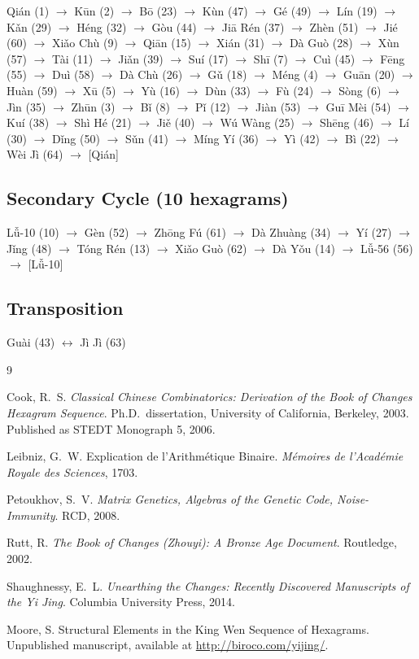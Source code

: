 \documentclass[11pt,a4paper]{article}
\begin{document}
{\small
\noindent
Qián (1) $\to$ Kūn (2) $\to$ Bō (23) $\to$ Kùn (47) $\to$ Gé (49) $\to$ Lín (19) $\to$ Kǎn (29) $\to$ Héng (32) $\to$ Gòu (44) $\to$ Jiā Rén (37) $\to$ Zhèn (51) $\to$ Jié (60) $\to$ Xiǎo Chù (9) $\to$ Qiān (15) $\to$ Xián (31) $\to$ Dà Guò (28) $\to$ Xùn (57) $\to$ Tài (11) $\to$ Jiǎn (39) $\to$ Suí (17) $\to$ Shī (7) $\to$ Cuì (45) $\to$ Fēng (55) $\to$ Duì (58) $\to$ Dà Chù (26) $\to$ Gǔ (18) $\to$ Méng (4) $\to$ Guān (20) $\to$ Huàn (59) $\to$ Xū (5) $\to$ Yù (16) $\to$ Dùn (33) $\to$ Fù (24) $\to$ Sòng (6) $\to$ Jìn (35) $\to$ Zhūn (3) $\to$ Bǐ (8) $\to$ Pǐ (12) $\to$ Jiàn (53) $\to$ Guī Mèi (54) $\to$ Kuí (38) $\to$ Shì Hé (21) $\to$ Jiě (40) $\to$ Wú Wàng (25) $\to$ Shēng (46) $\to$ Lí (30) $\to$ Dǐng (50) $\to$ Sǔn (41) $\to$ Míng Yí (36) $\to$ Yì (42) $\to$ Bì (22) $\to$ Wèi Jì (64) $\to$ [Qián]
}

\subsection*{Secondary Cycle (10 hexagrams)}

{\small
\noindent
Lǚ-10 (10) $\to$ Gèn (52) $\to$ Zhōng Fú (61) $\to$ Dà Zhuàng (34) $\to$ Yí (27) $\to$ Jǐng (48) $\to$ Tóng Rén (13) $\to$ Xiǎo Guò (62) $\to$ Dà Yǒu (14) $\to$ Lǚ-56 (56) $\to$ [Lǚ-10]
}

\subsection*{Transposition}

{\small
\noindent
Guài (43) $\leftrightarrow$ Jì Jì (63)
}


\begin{thebibliography}{9}

Cook, R.~S.
\textit{Classical Chinese Combinatorics: Derivation of the Book of Changes Hexagram Sequence}.
Ph.D.\ dissertation, University of California, Berkeley, 2003. Published as STEDT Monograph 5, 2006.

Leibniz, G.~W.
Explication de l'Arithm{\'e}tique Binaire.
\textit{M{\'e}moires de l'Acad{\'e}mie Royale des Sciences}, 1703.

Petoukhov, S.~V.
\textit{Matrix Genetics, Algebras of the Genetic Code, Noise-Immunity}.
RCD, 2008.

Rutt, R.
\textit{The Book of Changes (Zhouyi): A Bronze Age Document}.
Routledge, 2002.

Shaughnessy, E.~L.
\textit{Unearthing the Changes: Recently Discovered Manuscripts of the Yi Jing}.
Columbia University Press, 2014.

Moore, S.
Structural Elements in the King Wen Sequence of Hexagrams.
Unpublished manuscript, available at \url{http://biroco.com/yijing/}.

\end{thebibliography}
\end{document}
